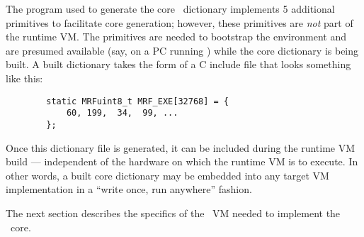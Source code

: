 \documentclass{article}
\begin{document}
The  program used to generate the core \M\ dictionary
implements 5 additional primitives to facilitate core generation;
however, these primitives are \textit{not} part of the runtime
VM. The primitives are needed to bootstrap the environment and are
presumed available (say, on a PC running ) while the
core dictionary is being built. A built dictionary takes the form of
a C include file that looks something like this:
\begin{verbatim}
        static MRFuint8_t MRF_EXE[32768] = {
            60, 199,  34,  99, ...
        };
\end{verbatim}
Once this dictionary file is generated, it can be included during the
runtime VM build --- independent of the hardware on which the runtime
VM is to execute. In other words, a built core dictionary may be
embedded into any target VM implementation in a ``write once, run
anywhere'' fashion.

The next section describes the specifics of the \M\ VM needed to
implement the \M\ core.
\end{document}
